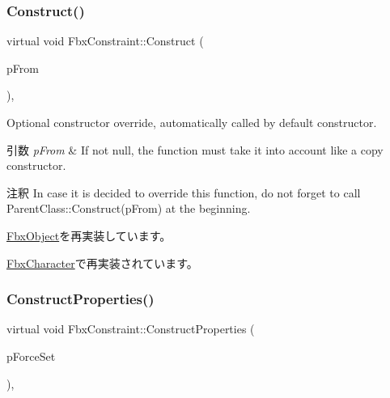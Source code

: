 \subsubsection{\texorpdfstring{Construct()}{Construct()}}
{\footnotesize\ttfamily virtual void Fbx\+Constraint\+::\+Construct (\begin{DoxyParamCaption}\item[{const \hyperlink{class_fbx_object}{Fbx\+Object} $\ast$}]{p\+From }\end{DoxyParamCaption})\hspace{0.3cm}{\ttfamily [protected]}, {\ttfamily [virtual]}}

Optional constructor override, automatically called by default constructor. 
\begin{DoxyParams}{引数}
{\em p\+From} & If not null, the function must take it into account like a copy constructor. \\
\hline
\end{DoxyParams}
\begin{DoxyRemark}{注釈}
In case it is decided to override this function, do not forget to call Parent\+Class\+::\+Construct(p\+From) at the beginning. 
\end{DoxyRemark}


\hyperlink{class_fbx_object_a313503bc645af3fdceb4a99ef5cea7eb}{Fbx\+Object}を再実装しています。



\hyperlink{class_fbx_character_afccb9b74c28560f04f05581a55c0b58a}{Fbx\+Character}で再実装されています。

\mbox{\label{class_fbx_constraint_a0470a25b813b337d07a03ce4b97b44f8}} 
\subsubsection{\texorpdfstring{Construct\+Properties()}{ConstructProperties()}}
{\footnotesize\ttfamily virtual void Fbx\+Constraint\+::\+Construct\+Properties (\begin{DoxyParamCaption}\item[{bool}]{p\+Force\+Set }\end{DoxyParamCaption})\hspace{0.3cm}{\ttfamily [protected]}, {\ttfamily [virtual]}}

